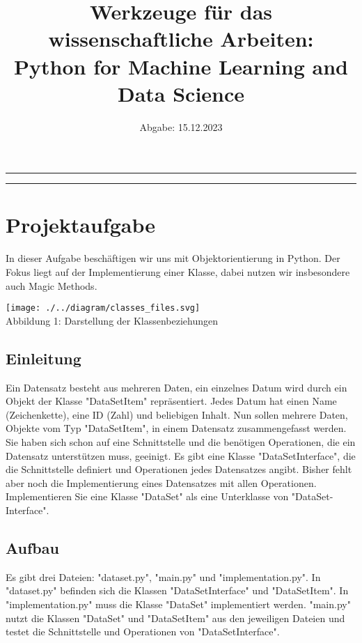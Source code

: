 \documentclass[a4paper,12pt]{article}
\title{
  {\Large Werkzeuge für das wissenschaftliche Arbeiten:} \\
  {\Large Python for Machine Learning and Data Science}
}
\date{Abgabe: 15.12.2023}
\begin{document}
\maketitle
\thispagestyle{empty}
\hrule
\tableofcontents
\vspace{1cm}
\hrule

\section{Projektaufgabe}
In dieser Aufgabe beschäftigen wir uns mit Objektorientierung in Python. Der Fokus liegt auf der Implementierung einer Klasse, dabei nutzen wir insbesondere auch Magic Methods.

\begin{center}
    \texttt{[image: ./../diagram/classes\_files.svg]}\\
    \small Abbildung 1: Darstellung der Klassenbeziehungen
\end{center}

\subsection{Einleitung}
Ein Datensatz besteht aus mehreren Daten, ein einzelnes Datum wird durch ein Objekt der Klasse "DataSetItem" repräsentiert. Jedes Datum hat einen Name (Zeichenkette), eine ID (Zahl) und beliebigen Inhalt. Nun sollen mehrere Daten, Objekte vom Typ "DataSetItem", in einem Datensatz zusammengefasst werden. Sie haben sich schon auf eine Schnittstelle und die benötigen Operationen, die ein Datensatz unterstützen muss, geeinigt. Es gibt eine Klasse "DataSetInterface", die die Schnittstelle definiert und Operationen jedes Datensatzes angibt. Bisher fehlt aber noch die Implementierung eines Datensatzes mit allen Operationen.
Implementieren Sie eine Klasse "DataSet" als eine Unterklasse von "DataSet-Interface".

\subsection{Aufbau}
Es gibt drei Dateien: "dataset.py", "main.py" und "implementation.py". In "dataset.py" befinden sich die Klassen "DataSetInterface" und "DataSetItem". In "implementation.py" muss die Klasse "DataSet" implementiert werden. "main.py" nutzt die Klassen "DataSet" und "DataSetItem" aus den jeweiligen Dateien und testet die Schnittstelle und Operationen von "DataSetInterface".
\end{document}
